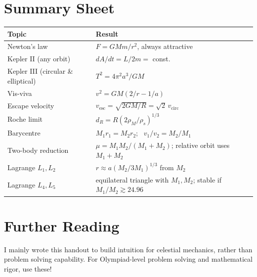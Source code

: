\documentclass[11pt]{article}
\begin{document}
\section{Summary Sheet}

\begin{center}
\renewcommand{\arraystretch}{1.6}
\begin{tabular}{|l|l|}
\hline
\textbf{Topic} & \textbf{Result} \\
\hline
Newton's law & $F = GMm/r^2$, always attractive \\
Kepler II (any orbit) & $dA/dt = L/2m = $ const. \\
Kepler III (circular \& elliptical) & $T^2 = 4\pi^2 a^3/GM$ \\
Vis-viva & $v^2 = GM(2/r - 1/a)$ \\
Escape velocity & $v_{\text{esc}} = \sqrt{2GM/R} = \sqrt2\,v_{\text{circ}}$ \\
Roche limit & $d_R = R(2\rho_M/\rho_s)^{1/3}$ \\
Barycentre & $M_1 r_1 = M_2 r_2$; \ $v_1/v_2 = M_2/M_1$ \\
Two-body reduction & $\mu = M_1M_2/(M_1+M_2)$; relative orbit uses $M_1+M_2$ \\
Lagrange $L_1, L_2$ & $r \approx a(M_2/3M_1)^{1/3}$ from $M_2$ \\
Lagrange $L_4, L_5$ & equilateral triangle with $M_1, M_2$; stable if $M_1/M_2 \gtrsim 24.96$ \\
\hline
\end{tabular}
\end{center}

\section{Further Reading}
I mainly wrote this handout to build intuition for celestial mechanics, rather than problem solving capability. For Olympiad-level problem solving and mathematical rigor, use these!
\end{document}
